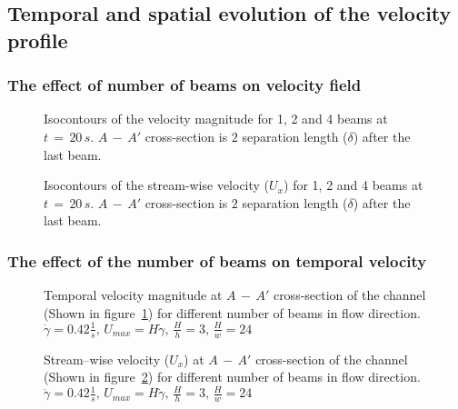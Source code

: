 \documentclass[preprint, letterpaper, nobibnotes, aps, superscriptaddress,prb]{revtex4-1}
\begin{document}
\subsection{Temporal and spatial evolution of the velocity profile}

\subsubsection{The effect of number of beams on velocity field}
\begin{figure}[H]
  \centering {}
  \caption{Isocontours of the velocity magnitude for 1, 2 and 4 beams at $t\,=\,20\,s$. $A\,-\,A'$ cross-section is $2$ separation length ($\delta$) after the last beam.}\protect\label{fig:U_spatial}
\end{figure}

\begin{figure}[H]
  \centering {}
  \caption{Isocontours of the stream-wise velocity ($U_x$) for 1, 2 and 4 beams at $t\,=\,20\,s$. $A\,-\,A'$ cross-section is $2$ separation length ($\delta$) after the last beam.}\protect\label{fig:Ux_spatial}
\end{figure}

\subsubsection{The effect of the number of beams on temporal velocity}


\begin{figure}[H]
  \centering {}
  \caption{Temporal velocity magnitude at $A\,-\,A'$ cross-section of the channel (Shown in figure~\ref{fig:U_spatial}) for different number of beams in flow direction. $\dot{\gamma}=0.42 \frac{1}{s},\,U_{max}=H\dot{\gamma},\,\frac{H}{h}=3,\,\frac{H}{w}=24$}\protect\label{fig:Nb_U}
\end{figure}

\begin{figure}[H]
  \centering {}
  \caption{Stream--wise velocity ($U_x$) at $A\,-\,A'$ cross-section of the channel (Shown in figure~\ref{fig:Ux_spatial}) for different number of beams in flow direction. $\dot{\gamma}=0.42 \frac{1}{s},\,U_{max}=H\dot{\gamma},\,\frac{H}{h}=3,\,\frac{H}{w}=24$}\protect\label{fig:Nb_Ux}
\end{figure}
\end{document}
